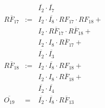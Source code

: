 \documentclass[a4paper,russian]{report}
\begin{document}
\begin{eqnarray*}
	& &  \overline{I_{2}} \cdotp \overline{I_{7}} \\
    \overline{RF_{17}} & := & I_{2} \cdotp \overline{I_{8}} \cdotp RF_{17} \cdotp RF_{18} + \\
	& &  I_{2} \cdotp \overline{RF_{17}} \cdotp \overline{RF_{18}} + \\
	& &  I_{2} \cdotp I_{8} \cdotp \overline{RF_{17}} + \\
	& &  \overline{I_{2}} \cdotp \overline{I_{3}} \\
    \overline{RF_{18}} & := & I_{2} \cdotp \overline{I_{8}} \cdotp RF_{18} + \\
	& &  I_{2} \cdotp I_{8} \cdotp \overline{RF_{18}} + \\
	& &  \overline{I_{2}} \cdotp \overline{I_{4}} \\
    \overline{O_{19}} & = & \overline{I_{2}} \cdotp \overline{I_{8}} \cdotp \overline{RF_{13}} \\
 \end{eqnarray*}
\pagebreak[1]
\end{document}
